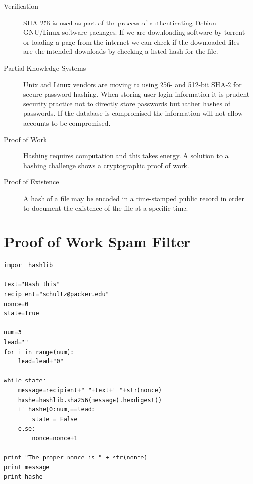 \documentclass{tufte-handout}
\begin{document}

\begin{description}
\item[Verification] SHA-256 is used as part of the process of authenticating Debian GNU/Linux software packages.  If we are downloading software by torrent or loading a page from the internet we can check if the downloaded files are the intended downloads by checking a listed hash for the file.
\item[Partial Knowledge Systems] Unix and Linux vendors are moving to using 256- and 512-bit SHA-2 for secure password hashing.  When storing user login information it is prudent security practice not to directly store passwords but rather hashes of passwords.  If the database is compromised the information will not allow accounts to be compromised.
\item[Proof of Work] Hashing requires computation and this takes energy.  A solution to a hashing challenge shows a cryptographic proof of work.
\item[Proof of Existence] A hash of a file may be encoded in a time-stamped public record in order to document the existence of the file at a specific time.  
\end{description}



\section{Proof of Work Spam Filter}
\footnotesize
\begin{framed}
\begin{verbatim}
import hashlib

text="Hash this"
recipient="schultz@packer.edu"
nonce=0
state=True

num=3
lead=""
for i in range(num):
    lead=lead+"0"

while state:
    message=recipient+" "+text+" "+str(nonce)
    hashe=hashlib.sha256(message).hexdigest()
    if hashe[0:num]==lead:
        state = False
    else:
        nonce=nonce+1

print "The proper nonce is " + str(nonce)
print message
print hashe
\end{verbatim}
\end{framed}
\end{document}
